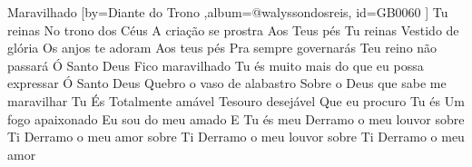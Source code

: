 \beginsong
{Maravilhado %
}[by={Diante do Trono %
},album={@walyssondosreis},
id={GB0060 %
}] 
\beginverse*
Tu reinas
No trono dos Céus
A criação se prostra
Aos Teus pés
\endverse
\beginverse*
Tu reinas
Vestido de glória
Os anjos te adoram
Aos teus pés
\endverse
\beginverse*
Pra sempre governarás
Teu reino não passará
\endverse
\beginchorus
Ó Santo Deus
Fico maravilhado
Tu és muito mais do que eu possa expressar
Ó Santo Deus
Quebro o vaso de alabastro
Sobre o Deus que sabe me maravilhar
\endchorus
\beginverse*
Tu És
Totalmente amável
Tesouro desejável
Que eu procuro
\endverse
\beginverse*
Tu és
Um fogo apaixonado
Eu sou do meu amado
E Tu és meu
\endverse
\beginverse*
Derramo o meu louvor sobre Ti
Derramo o meu amor sobre Ti
Derramo o meu louvor sobre Ti
Derramo o meu amor
\endverse

